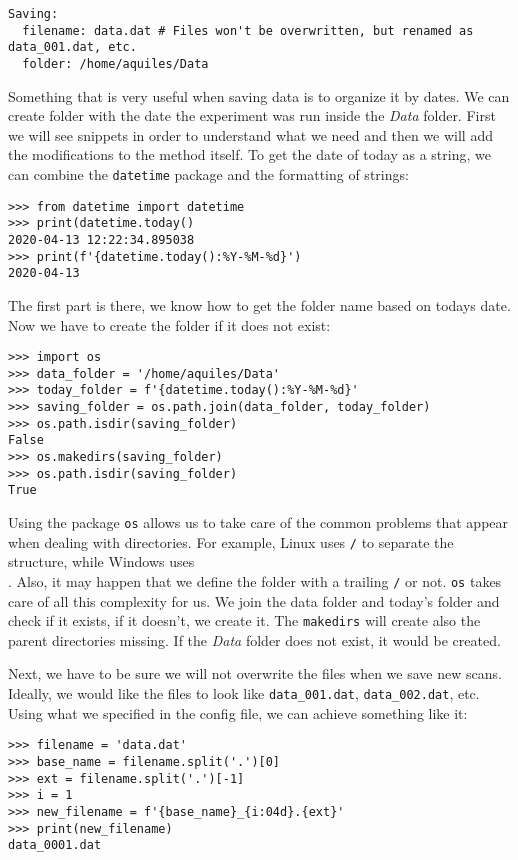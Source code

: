\begin{verbatim}
Saving:
  filename: data.dat # Files won't be overwritten, but renamed as data_001.dat, etc.
  folder: /home/aquiles/Data
\end{verbatim}

Something that is very useful when saving data is to organize it by dates. We can create folder with the date the experiment was run inside the \emph{Data} folder. First we will see snippets in order to understand what we need and then we will add the modifications to the method itself. To get the date of today as a string, we can combine the \texttt{datetime} package and the formatting of strings:

\begin{verbatim}
>>> from datetime import datetime
>>> print(datetime.today()
2020-04-13 12:22:34.895038
>>> print(f'{datetime.today():%Y-%M-%d}')
2020-04-13
\end{verbatim}

The first part is there, we know how to get the folder name based on todays date. Now we have to create the folder if it does not exist:

\begin{verbatim}
>>> import os
>>> data_folder = '/home/aquiles/Data'
>>> today_folder = f'{datetime.today():%Y-%M-%d}'
>>> saving_folder = os.path.join(data_folder, today_folder)
>>> os.path.isdir(saving_folder)
False
>>> os.makedirs(saving_folder)
>>> os.path.isdir(saving_folder)
True
\end{verbatim}

Using the package \texttt{os} allows us to take care of the common problems that appear when dealing with directories. For example, Linux uses \texttt{/} to separate the structure, while Windows uses \texttt{\\}. Also, it may happen that we define the folder with a trailing \texttt{/} or not. \texttt{os} takes care of all this complexity for us. We join the data folder and today's folder and check if it exists, if it doesn't, we create it. The \texttt{makedirs} will create also the parent directories missing. If the \emph{Data} folder does not exist, it would be created.

Next, we have to be sure we will not overwrite the files when we save new scans. Ideally, we would like the files to look like \texttt{data\_001.dat}, \texttt{data\_002.dat}, etc. Using what we specified in the config file, we can achieve something like it:

\begin{verbatim}
>>> filename = 'data.dat'
>>> base_name = filename.split('.')[0]
>>> ext = filename.split('.')[-1]
>>> i = 1
>>> new_filename = f'{base_name}_{i:04d}.{ext}'
>>> print(new_filename)
data_0001.dat
\end{verbatim}

